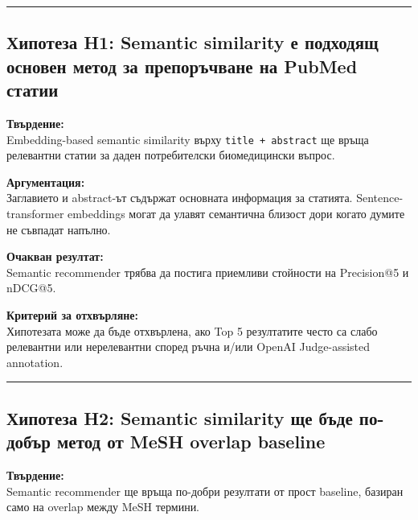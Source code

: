 \documentclass[12pt,a4paper]{article}
\begin{document}
\vspace{0.5em}\hrule\vspace{1.0em}

\subsection{Хипотеза H1: Semantic similarity е подходящ основен метод за препоръчване на PubMed статии}\label{ux445ux438ux43fux43eux442ux435ux437ux430-h1-semantic-similarity-ux435-ux43fux43eux434ux445ux43eux434ux44fux449-ux43eux441ux43dux43eux432ux435ux43d-ux43cux435ux442ux43eux434-ux437ux430-ux43fux440ux435ux43fux43eux440ux44aux447ux432ux430ux43dux435-ux43dux430-pubmed-ux441ux442ux430ux442ux438ux438}

\textbf{Твърдение:}\\
Embedding-based semantic similarity върху \texttt{title\ +\ abstract} ще връща релевантни статии за даден потребителски биомедицински въпрос.

\textbf{Аргументация:}\\
Заглавието и abstract-ът съдържат основната информация за статията. Sentence-transformer embeddings могат да улавят семантична близост дори когато думите не съвпадат напълно.

\textbf{Очакван резултат:}\\
Semantic recommender трябва да постига приемливи стойности на Precision@5 и nDCG@5.

\textbf{Критерий за отхвърляне:}\\
Хипотезата може да бъде отхвърлена, ако Top 5 резултатите често са слабо релевантни или нерелевантни според ръчна и/или OpenAI Judge-assisted annotation.

\vspace{0.5em}\hrule\vspace{1.0em}

\subsection{Хипотеза H2: Semantic similarity ще бъде по-добър метод от MeSH overlap baseline}\label{ux445ux438ux43fux43eux442ux435ux437ux430-h2-semantic-similarity-ux449ux435-ux431ux44aux434ux435-ux43fux43e-ux434ux43eux431ux44aux440-ux43cux435ux442ux43eux434-ux43eux442-mesh-overlap-baseline}

\textbf{Твърдение:}\\
Semantic recommender ще връща по-добри резултати от прост baseline, базиран само на overlap между MeSH термини.
\end{document}
